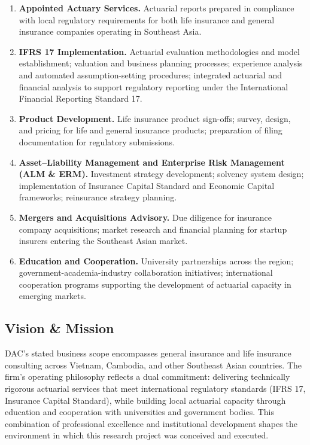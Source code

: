 \begin{enumerate}
\def\labelenumi{\arabic{enumi}.}
\item
  \textbf{Appointed Actuary Services.} Actuarial reports prepared in compliance with local regulatory requirements for both life insurance and general insurance companies operating in Southeast Asia.
\item
  \textbf{IFRS 17 Implementation.} Actuarial evaluation methodologies and model establishment; valuation and business planning processes; experience analysis and automated assumption-setting procedures; integrated actuarial and financial analysis to support regulatory reporting under the International Financial Reporting Standard 17.
\item
  \textbf{Product Development.} Life insurance product sign-offs; survey, design, and pricing for life and general insurance products; preparation of filing documentation for regulatory submissions.
\item
  \textbf{Asset--Liability Management and Enterprise Risk Management (ALM \& ERM).} Investment strategy development; solvency system design; implementation of Insurance Capital Standard and Economic Capital frameworks; reinsurance strategy planning.
\item
  \textbf{Mergers and Acquisitions Advisory.} Due diligence for insurance company acquisitions; market research and financial planning for startup insurers entering the Southeast Asian market.
\item
  \textbf{Education and Cooperation.} University partnerships across the region; government-academia-industry collaboration initiatives; international cooperation programs supporting the development of actuarial capacity in emerging markets.
\end{enumerate}

\subsection{Vision \& Mission}\label{vision-mission}

DAC's stated business scope encompasses general insurance and life insurance consulting across Vietnam, Cambodia, and other Southeast Asian countries. The firm's operating philosophy reflects a dual commitment: delivering technically rigorous actuarial services that meet international regulatory standards (IFRS 17, Insurance Capital Standard), while building local actuarial capacity through education and cooperation with universities and government bodies. This combination of professional excellence and institutional development shapes the environment in which this research project was conceived and executed.

